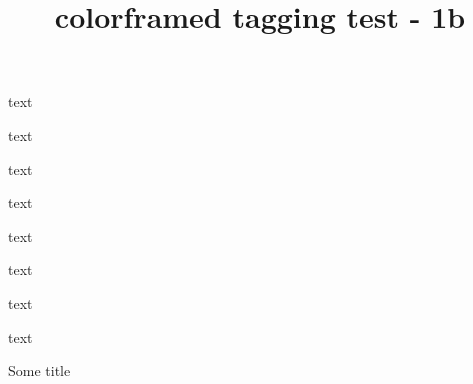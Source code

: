 \documentclass{article}
\title{colorframed tagging test - 1b}
\begin{document}
text

\begin{framed}
text
\end{framed}

\begin{oframed}
text
\end{oframed}

\begin{shaded}
text
\end{shaded}

\begin{shaded*}
text
\end{shaded*}

\begin{leftbar}
text
\end{leftbar}

\begin{snugshade}
text
\end{snugshade}

\begin{snugshade*}
text
\end{snugshade*}

\begin{titled-frame}{Some title}
\kant[1-6]
\end{titled-frame}

\begin{framed}
\kant[1-6]
\end{framed}
\end{document}
